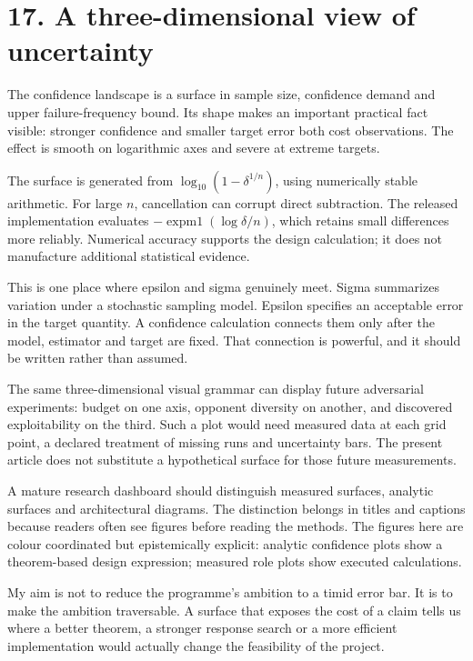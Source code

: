 \documentclass[10pt]{article}
\begin{document}
\clearpage
\section*{17. A three-dimensional view of uncertainty}
The confidence landscape is a surface in sample size, confidence demand and upper failure-frequency bound. Its shape makes an important practical fact visible: stronger confidence and smaller target error both cost observations. The effect is smooth on logarithmic axes and severe at extreme targets.

The surface is generated from $\log_{10}(1-\delta^{1/n})$, using numerically stable arithmetic. For large $n$, cancellation can corrupt direct subtraction. The released implementation evaluates $-\operatorname{expm1}(\log\delta/n)$, which retains small differences more reliably. Numerical accuracy supports the design calculation; it does not manufacture additional statistical evidence.

This is one place where epsilon and sigma genuinely meet. Sigma summarizes variation under a stochastic sampling model. Epsilon specifies an acceptable error in the target quantity. A confidence calculation connects them only after the model, estimator and target are fixed. That connection is powerful, and it should be written rather than assumed.

The same three-dimensional visual grammar can display future adversarial experiments: budget on one axis, opponent diversity on another, and discovered exploitability on the third. Such a plot would need measured data at each grid point, a declared treatment of missing runs and uncertainty bars. The present article does not substitute a hypothetical surface for those future measurements.

A mature research dashboard should distinguish measured surfaces, analytic surfaces and architectural diagrams. The distinction belongs in titles and captions because readers often see figures before reading the methods. The figures here are colour coordinated but epistemically explicit: analytic confidence plots show a theorem-based design expression; measured role plots show executed calculations.

My aim is not to reduce the programme's ambition to a timid error bar. It is to make the ambition traversable. A surface that exposes the cost of a claim tells us where a better theorem, a stronger response search or a more efficient implementation would actually change the feasibility of the project.
\end{document}
